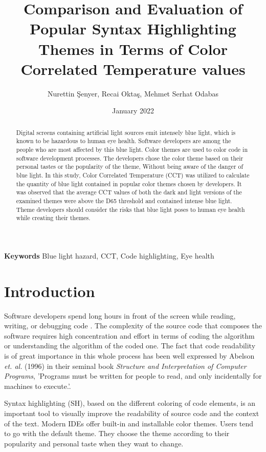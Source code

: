 \documentclass{article}
\title{Comparison and Evaluation of Popular Syntax Highlighting Themes in Terms of Color Correlated Temperature values}
\author{Nurettin Şenyer, Recai Oktaş, Mehmet Serhat Odabas}
\date{January 2022}
\begin{document}
\maketitle

\begin{abstract}
Digital screens containing artificial light sources emit intensely blue light, which is known to be hazardous to human eye health. Software developers are among the people who are most affected by this blue light. Color themes are used to color code in software development processes. The developers chose the color theme based on their personal tastes or the popularity of the theme, Without being aware of the danger of blue light. In this study, Color Correlated Temperature (CCT) was utilized to calculate the quantity of blue light contained in popular color themes chosen by developers. It was observed that the average CCT values of both the dark and light versions of the examined themes were above the D65 threshold and contained intense blue light. Theme developers should consider the risks that blue light poses to human eye health while creating their themes.
\end{abstract}

\textbf{Keywords} Blue light hazard, CCT, Code highlighting, Eye health

\section{Introduction} \label{sec:introduction}

Software developers spend long hours in front of the screen while reading, writing, or debugging code \cite{vigliarolo2019report}. The complexity of the source code that composes the software requires high concentration and effort in terms of coding the algorithm or understanding the algorithm of the coded one.
The fact that code readability is of great importance in this whole process has been well expressed by Abelson \emph{et. al.} (1996) in their seminal book \emph{Structure and Interpretation of Computer Programs}, 'Programs must be written for people to read, and only incidentally for machines to execute.'\cite{abelson1996sicp}. 

Syntax highlighting (SH), based on the different coloring of code elements, is an important tool to visually improve the readability of source code and the context of the text. Modern IDEs offer built-in and installable color themes. Users tend to go with the default theme. They choose the theme according to their popularity and personal taste when they want to change.
\end{document}
